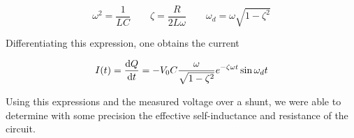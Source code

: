 $$
\omega^2 = \frac{1}{LC} \qquad
\zeta = \frac{R}{2L \omega} \qquad
\omega_d = \omega \sqrt{1-\zeta^2}
$$

Differentiating this expression, one obtains the current

$$
I(t) = \frac{\mathrm d Q}{\mathrm d t} = -V_0 C \frac{\omega}{\sqrt{1-\zeta^2}} e^{-\zeta \omega 
t} \sin{\omega_d t}
$$

Using this expressions and the measured voltage over a shunt, we were able to 
determine with some precision the effective self-inductance and resistance of 
the circuit.
